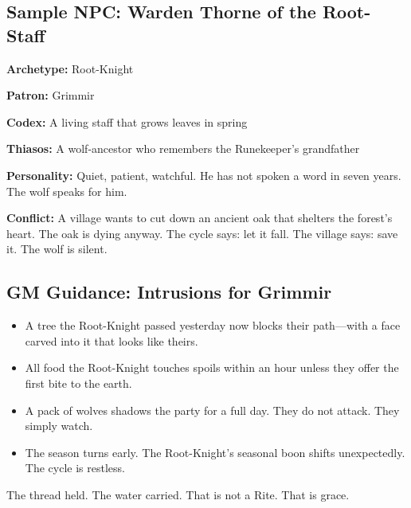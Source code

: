 \subsection{Sample NPC: Warden Thorne of the Root-Staff}

\textbf{Archetype:} Root-Knight

\textbf{Patron:} Grimmir

\textbf{Codex:} A living staff that grows leaves in spring

\textbf{Thiasos:} A wolf-ancestor who remembers the Runekeeper's grandfather

\textbf{Personality:} Quiet, patient, watchful. He has not spoken a word in seven years. The wolf speaks for him.

\textbf{Conflict:} A village wants to cut down an ancient oak that shelters the forest's heart. The oak is dying anyway. The cycle says: let it fall. The village says: save it. The wolf is silent.

\subsection{GM Guidance: Intrusions for Grimmir}

\begin{itemize}
\item A tree the Root-Knight passed yesterday now blocks their path—with a face carved into it that looks like theirs.
\item All food the Root-Knight touches spoils within an hour unless they offer the first bite to the earth.
\item A pack of wolves shadows the party for a full day. They do not attack. They simply watch.
\item The season turns early. The Root-Knight's seasonal boon shifts unexpectedly. The cycle is restless.
\end{itemize}

The thread held. The water carried. That is not a Rite. That is grace.
